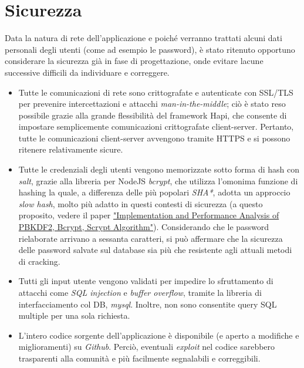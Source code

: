 \documentclass[11pt]{report}
\begin{document}
\section{Sicurezza}
Data la natura di rete dell'applicazione e poiché verranno trattati alcuni dati personali degli utenti (come ad esempio le password), è stato ritenuto opportuno considerare la sicurezza già in fase di progettazione, onde evitare lacune successive difficili da individuare e correggere.
\begin{itemize}
	\item Tutte le comunicazioni di rete sono crittografate e autenticate con SSL/TLS per prevenire intercettazioni e attacchi \textit{man-in-the-middle}; ciò è stato reso possibile grazie alla grande flessibilità del framework Hapi, che consente di impostare semplicemente comunicazioni crittografate client-server.
	Pertanto, tutte le comunicazioni client-server avvengono tramite HTTPS e si possono ritenere relativamente sicure.
	\item Tutte le credenziali degli utenti vengono memorizzate sotto forma di hash con \textit{salt}, grazie alla libreria per NodeJS \textit{bcrypt}, che utilizza l'omonima funzione di hashing la quale, a differenza delle più popolari \textit{SHA*}, adotta un approccio \textit{slow hash}, molto più adatto in questi contesti di sicurezza (a questo proposito, vedere il paper \href{http://worldcomp-proceedings.com/proc/p2016/ICW3865.pdf}{"Implementation and Performance Analysis of PBKDF2, Bcrypt, Scrypt Algorithm"}).
	Considerando che le password rielaborate arrivano a sessanta caratteri, si può affermare che la sicurezza delle password salvate sul database sia più che resistente agli attuali metodi di cracking.
	\item Tutti gli input utente vengono validati per impedire lo sfruttamento di attacchi come \textit{SQL injection} e \textit{buffer overflow}, tramite la libreria di interfacciamento col DB, \textit{mysql}. Inoltre, non sono consentite query SQL multiple per una sola richiesta.
	\item L'intero codice sorgente dell'applicazione è disponibile (e aperto a modifiche e miglioramenti) su \textit{Github}.
	Perciò, eventuali \textit{exploit} nel codice sarebbero trasparenti alla comunità e più facilmente segnalabili e correggibili.
\end{itemize}
\pagebreak
\end{document}
